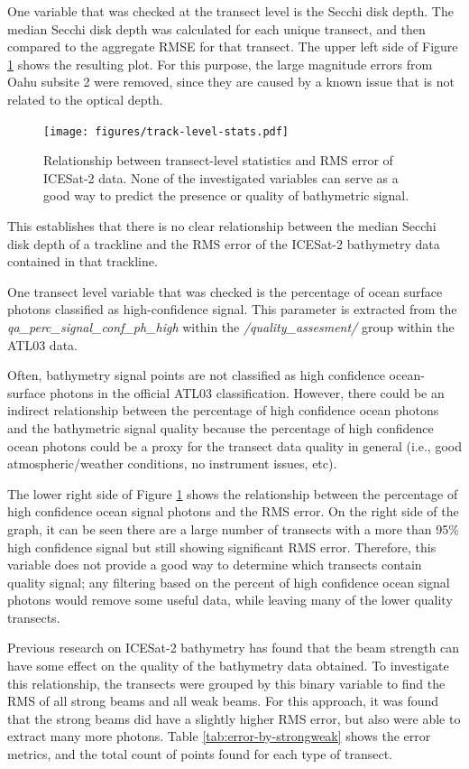 One variable that was checked at the transect level is the Secchi disk depth. The median Secchi disk depth was calculated for each unique transect, and then compared to the aggregate RMSE for that transect. The upper left side of Figure \ref{fig:track-level-stats} shows the resulting plot. For this purpose, the large magnitude errors from Oahu subsite 2 were removed, since they are caused by a known issue that is not related to the optical depth.

\begin{figure}[!ht]
    \centering
    \texttt{[image: figures/track-level-stats.pdf]}
    \caption{Relationship between transect-level statistics and RMS error of ICESat-2 data. None of the investigated variables can serve as a good way to predict the presence or quality of bathymetric signal.}
    \label{fig:track-level-stats}
\end{figure}

This establishes that there is no clear relationship between the median Secchi disk depth of a trackline and the RMS error of the ICESat-2 bathymetry data contained in that trackline.

One transect level variable that was checked is the percentage of ocean surface photons classified as high-confidence signal. This parameter is extracted from the \emph{qa\_perc\_signal\_conf\_ph\_high} within the \emph{/quality\_assesment/} group within the ATL03 data.

Often, bathymetry signal points are not classified as high confidence ocean-surface photons in the official ATL03 classification. However, there could be an indirect relationship between the percentage of high confidence ocean photons and the bathymetric signal quality because the percentage of high confidence ocean photons could be a proxy for the transect data quality in general (i.e., good atmospheric/weather conditions, no instrument issues, etc).

The lower right side of Figure \ref{fig:track-level-stats} shows the relationship between the percentage of high confidence ocean signal photons and the RMS error. On the right side of the graph, it can be seen there are a large number of transects with a more than 95\% high confidence signal but still showing significant RMS error. Therefore, this variable does not provide a good way to determine which transects contain quality signal; any filtering based on the percent of high confidence ocean signal photons would remove some useful data, while leaving many of the lower quality transects.

Previous research on ICESat-2 bathymetry has found that the beam strength can have some effect on the quality of the bathymetry data obtained. To investigate this relationship, the transects were grouped by this binary variable to find the RMS of all strong beams and all weak beams. For this approach, it was found that the strong beams did have a slightly higher RMS error, but also were able to extract many more photons. Table \ref{tab:error-by-strongweak} shows the error metrics, and the total count of points found for each type of transect.





